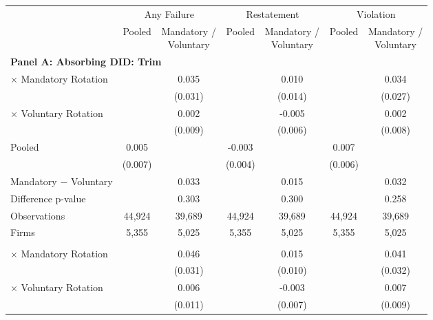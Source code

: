 \documentclass[10pt]{article}
\newcommand{\sym}[1]{\textsuperscript{#1}}
\begin{document}
\begin{minipage}{19cm}\fontsize{10}{12}\selectfont\setlength{\tabcolsep}{4pt}\renewcommand{\arraystretch}{1.12}


\def\sym#1{\ifmmode^{#1}\else\(^{#1}\)\fi}
\centering
{}
\label{tab:absorbing-transition-master-plus-downgrade-no-auditfirm-fe}
\begin{threeparttable}

\begin{tabular}{l cc cc cc}
\toprule
 & \multicolumn{2}{c}{Any Failure} & \multicolumn{2}{c}{Restatement} & \multicolumn{2}{c}{Violation} \\
\cmidrule(lr){2-3}\cmidrule(lr){4-5}\cmidrule(lr){6-7}
 & Pooled & \shortstack{Mandatory /\\Voluntary} & Pooled & \shortstack{Mandatory /\\Voluntary} & Pooled & \shortstack{Mandatory /\\Voluntary} \\
\midrule
\multicolumn{7}{l}{\textbf{Panel A: Absorbing DID: Trim}} \\
$\times$ Mandatory Rotation &  & 0.035 &  & 0.010 &  & 0.034 \\
 &  & (0.031) &  & (0.014) &  & (0.027) \\
$\times$ Voluntary Rotation &  & 0.002 &  & -0.005 &  & 0.002 \\
 &  & (0.009) &  & (0.006) &  & (0.008) \\
Pooled & 0.005 &  & -0.003 &  & 0.007 &  \\
 & (0.007) &  & (0.004) &  & (0.006) &  \\
Mandatory $-$ Voluntary &  & 0.033 &  & 0.015 &  & 0.032 \\
Difference p-value &  & 0.303 &  & 0.300 &  & 0.258 \\
Observations & 44,924 & 39,689 & 44,924 & 39,689 & 44,924 & 39,689 \\
Firms & 5,355 & 5,025 & 5,355 & 5,025 & 5,355 & 5,025 \\
\addlinespace
\multicolumn{7}{l}{\textbf{Panel B: Absorbing DID: Strict}} \\
$\times$ Mandatory Rotation &  & 0.046 &  & 0.015 &  & 0.041 \\
 &  & (0.031) &  & (0.010) &  & (0.032) \\
$\times$ Voluntary Rotation &  & 0.006 &  & -0.003 &  & 0.007 \\
 &  & (0.011) &  & (0.007) &  & (0.009) \\

\end{tabular}
\end{threeparttable}
\end{minipage}
\end{document}
